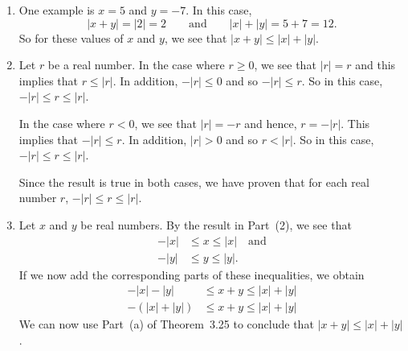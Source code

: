 \documentclass[11pt]{article}
\begin{document}
\begin{enumerate}
\item One example is $x = 5$ and $y = -7$.  In this case, 
\[
\left| x + y \right| = \left| 2 \right| = 2 \qquad \text{and} \qquad \left| x \right| + \left| y \right| = 5 + 7 = 12.
\]
So for these values of $x$ and $y$, we see that 
$\left| x + y \right| \leq \left| x \right| + \left| y \right|$.

\item Let $r$ be a real number. In the case where $r \geq 0$, we see that $\left| r \right| = r$ and this implies that $r \leq \left| r \right|$. In addition, $-\left| r \right| \leq 0$ and so 
$-\left| r \right| \leq r$.  So in this case, $-\left| r \right| \leq r \leq \left| r \right|$.

In the case where $r < 0$, we see that $\left| r \right| = -r$ and hence, 
$r = -\left| r \right|$.  This implies that 
$-\left| r \right| \leq r$. In addition, $\left| r \right| > 0$ and so 
$r < \left| r \right|$.  So in this case, $-\left| r \right| \leq r \leq \left| r \right|$.

Since the result is true in both cases, we have proven that for each real number $r$, 
$-\left| r \right| \leq r \leq \left| r \right|$.

\item Let $x$ and $y$ be real numbers.  By the result in Part~(2), we see that
\begin{align*}
-\left| x \right| &\leq x \leq \left| x \right| \quad \text{and} \\
-\left| y \right| &\leq y \leq \left| y \right|.
\end{align*}
If we now add the corresponding parts of these inequalities, we obtain
\begin{align*}
-\left| x \right| - \left| y \right| &\leq x + y \leq \left| x \right| + \left| y \right| \\
-\left( \left| x \right| + \left| y \right| \right) &\leq x + y \leq \left| x \right| + \left| y \right|
\end{align*}
We can now use Part~(a) of Theorem~3.25 to conclude that 
$\left| x + y \right| \leq \left| x \right| + \left| y \right|$.
\end{enumerate}
\end{document}
